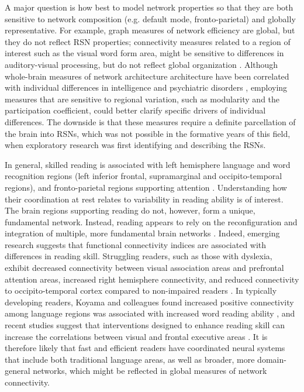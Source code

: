 \begin{itmeize}
A major question is how best to model network properties so that they are both sensitive to network composition (e.g. default mode, fronto-parietal) and globally representative. For example, graph measures of network efficiency are global, but they do not reflect RSN properties; connectivity measures related to a region of interest such as the visual word form area, might be sensitive to differences in auditory-visual processing, but do not reflect global organization \citep{Rubinov2010}. Although whole-brain measures of network architecture architecture have been correlated with individual differences in intelligence and psychiatric disorders \citep{}, employing measures that are sensitive to regional variation, such as modularity and the participation coefficient, could better clarify specific drivers of individual differences. The downside is that these measures require a definite parcellation of the brain into RSNs, which was not possible in the formative years of this field, when exploratory research was first identifying and describing the RSNs. 

In general, skilled reading is associated with left hemisphere language and word recognition regions (left inferior frontal, supramarginal and occipito-temporal regions), and fronto-parietal regions supporting attention \citep{Paulesu2014}. Understanding how their coordination at rest relates to variability in reading ability is of interest. The brain regions supporting reading do not, however, form a unique, fundamental network. Instead, reading appears to rely on the reconfiguration and integration of multiple, more fundamental brain networks \citep{Koyama2010, Vogel2013}. Indeed, emerging research suggests that functional connectivity indices are associated with differences in reading skill. Struggling readers, such as those with dyslexia, exhibit decreased connectivity between visual association areas and prefrontal attention areas, increased right hemisphere connectivity, and reduced connectivity to occipito-temporal cortex compared to non-impaired readers \citep{Finn2014}.  In typically developing readers, Koyama and colleagues found increased positive connectivity among language regions was associated with increased word reading ability \citep{Koyama2011}, and recent studies suggest that interventions designed to enhance reading skill can increase the correlations between visual and frontal executive areas \citep{Horowitz-Kraus2015}. It is therefore likely that fast and efficient readers have coordinated neural systems that include both traditional language areas, as well as broader, more domain-general networks, which might be reflected in global measures of network connectivity.


\end{itmeize}
